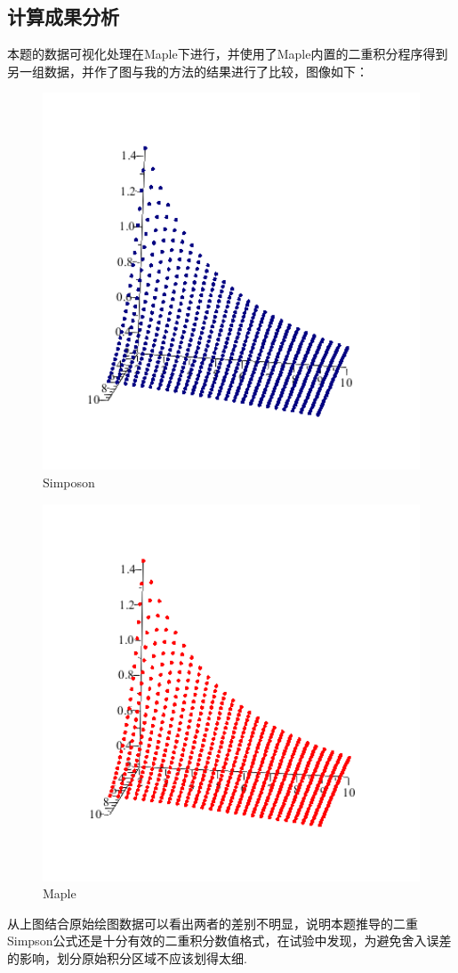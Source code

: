 \documentclass{ctexart}
\begin{document}
\subsection{计算成果分析}
本题的数据可视化处理在Maple下进行，并使用了Maple内置的二重积分程序得到另一组数据，并作了图与我的方法的结果进行了比较，图像如下：
\begin{figure}[H]
\centering
\includegraphics[width=1.3\textwidth]{doubleSimpson.png}
\caption{Simposon}
\end{figure}
\begin{figure}[H]
\centering
\includegraphics[width=1.3\textwidth]{doubleSimpson1.png}
\caption{Maple}
\end{figure}
从上图结合原始绘图数据可以看出两者的差别不明显，说明本题推导的二重Simpson公式还是十分有效的二重积分数值格式，在试验中发现，为避免舍入误差的影响，划分原始积分区域不应该划得太细.
\end{document}
